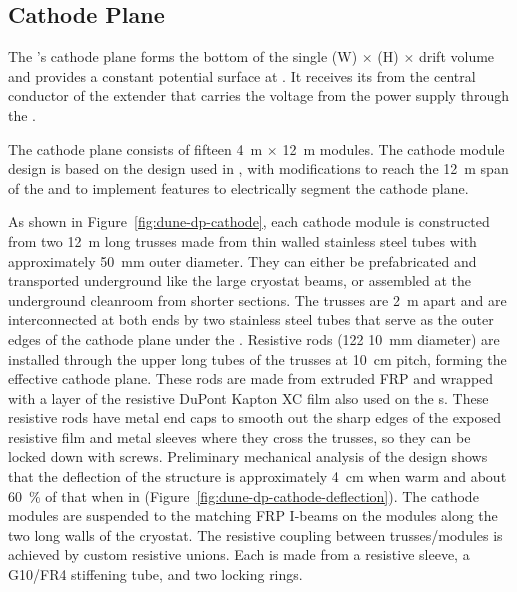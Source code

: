 
\subsection{Cathode Plane}

The \dpmod{}'s cathode plane forms the  bottom of the single 
\dptpcwdth (W) $\times$ \tpcheight (H) $\times$ \dptpclen
drift volume and provides a constant potential surface at \dptargetdriftvoltneg{}.  It receives its  from the central conductor of the extender that carries the voltage from the power supply through the  \fdth.  

The cathode plane consists of fifteen \SI{4}{\m} $\times$ \SI{12}{\m} modules. 
The cathode module design is based on the design used in  , with modifications to reach the \SI{12}{\m} span of the  and to implement features to electrically segment the cathode plane.

As shown in  Figure~\ref{fig:dune-dp-cathode}, each cathode module is constructed from two \SI{12}{\m} long trusses made from thin walled stainless steel tubes with approximately \SI{50}{\mm} outer diameter.  They can either be prefabricated and transported underground like the large cryostat beams, or assembled at the underground  cleanroom from shorter sections. The trusses are \SI{2}{\m} apart and are interconnected at both ends by two stainless steel tubes that serve as the outer edges of the cathode plane under the . Resistive rods (\num{122} \SI{10}{\mm} diameter) are installed through the upper long tubes of the trusses at \SI{10}{\cm} pitch, forming the effective cathode plane. These rods are made from extruded FRP and wrapped with a layer of the resistive DuPont Kapton XC film also used on the \single {}s. These resistive rods have metal end caps to smooth out the sharp edges of the exposed resistive film and metal sleeves where they cross the trusses, so they can be locked down with screws. Preliminary mechanical analysis of the design shows that the deflection of the structure is approximately \SI{4}{\cm} when warm and about \num{60}~\% of that when in  (Figure~\ref{fig:dune-dp-cathode-deflection}).  The cathode modules are suspended to the matching FRP I-beams on the  modules along the two long walls of the cryostat. The resistive coupling between trusses/modules is achieved by custom resistive unions.  Each is made from a resistive sleeve, a G10/FR4 stiffening tube, and two locking rings. 


